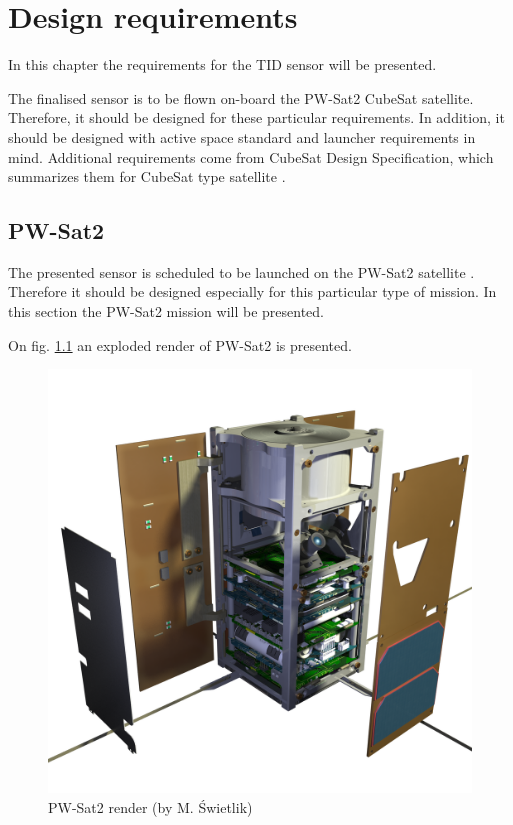 \chapter{Design requirements}
\label{Design_requirements}

In this chapter the requirements for the TID sensor will be presented.

The finalised sensor is to be flown on-board the PW-Sat2 CubeSat satellite. Therefore, it should be designed for these particular requirements. In addition, it should be designed with active space standard and launcher requirements in mind. Additional requirements come from CubeSat Design Specification, which summarizes them for CubeSat type satellite \cite{CDS}.

\section{PW-Sat2}
    The presented sensor is scheduled to be launched on the PW-Sat2 satellite \cite{PW-Sat2URL}. Therefore it should be designed especially for this particular type of mission. In this section the PW-Sat2 mission will be presented.

    On fig. \ref{PW-Sat_render_01} an exploded render of PW-Sat2 is presented.

    \begin{figure}[h]
        \centering
        \includegraphics[width=0.5\paperwidth]{img/04/PW-Sat2_render_01.png}
        \caption{PW-Sat2 render (by M. Świetlik)}
        \label{PW-Sat_render_01}
    \end{figure}


